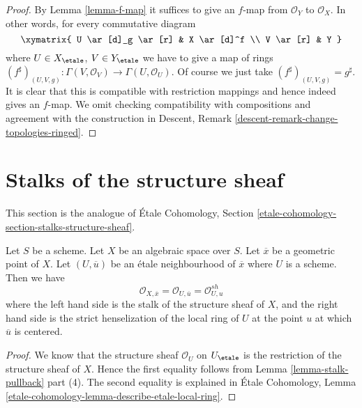 \begin{proof}
By Lemma \ref{lemma-f-map} it suffices to give an $f$-map from
$\mathcal{O}_Y$ to $\mathcal{O}_X$. In other words, for every
commutative diagram
$$
\xymatrix{
U \ar[d]_g \ar[r] & X \ar[d]^f \\
V \ar[r] & Y
}
$$
where $U \in X_\etale$, $V \in Y_\etale$ we have to give a
map of rings
$
(f^\sharp)_{(U, V, g)} :
\Gamma(V, \mathcal{O}_V)
\to
\Gamma(U, \mathcal{O}_U).
$
Of course we just take $(f^\sharp)_{(U, V, g)} = g^\sharp$.
It is clear that this is compatible with restriction mappings
and hence indeed gives an $f$-map.
We omit checking compatibility with compositions and agreement with the
construction in
Descent, Remark \ref{descent-remark-change-topologies-ringed}.
\end{proof}







\section{Stalks of the structure sheaf}
\label{section-stalks-structure-sheaf}

\noindent
This section is the analogue of
\'Etale Cohomology, Section
\ref{etale-cohomology-section-stalks-structure-sheaf}.

\begin{lemma}
\label{lemma-describe-etale-local-ring}
Let $S$ be a scheme.
Let $X$ be an algebraic space over $S$.
Let $\overline{x}$ be a geometric point of $X$.
Let $(U, \overline{u})$ be an \'etale neighbourhood of $\overline{x}$
where $U$ is a scheme. Then we have
$$
\mathcal{O}_{X, \overline{x}} =
\mathcal{O}_{U, \overline{u}} =
\mathcal{O}_{U, u}^{sh}
$$
where the left hand side is the stalk of the structure sheaf of $X$,
and the right hand side is the strict henselization of the local ring
of $U$ at the point $u$ at which $\overline{u}$ is centered.
\end{lemma}

\begin{proof}
We know that the structure sheaf $\mathcal{O}_U$ on
$U_\etale$ is the restriction of the structure sheaf of $X$.
Hence the first equality follows from
Lemma \ref{lemma-stalk-pullback} part (4).
The second equality is explained in
\'Etale Cohomology,
Lemma \ref{etale-cohomology-lemma-describe-etale-local-ring}.
\end{proof}

